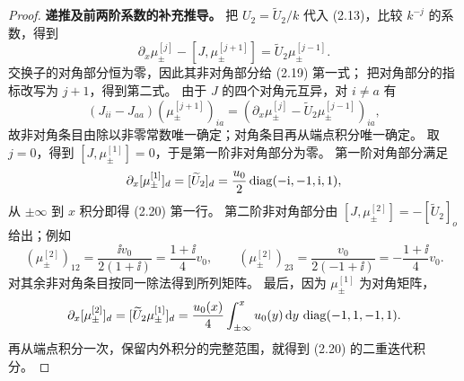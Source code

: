 \begin{proof}
\textbf{递推及前两阶系数的补充推导。}
把 $U_2=\widetilde U_2/k$ 代入 (2.13)，比较 $k^{-j}$ 的系数，得到
\[
\partial_x\mu_\pm^{[j]}-[J,\mu_\pm^{[j+1]}]
=\widetilde U_2\mu_\pm^{[j-1]}.
\]
交换子的对角部分恒为零，因此其非对角部分给 (2.19) 第一式；
把对角部分的指标改写为 $j+1$，得到第二式。
由于 $J$ 的四个对角元互异，对 $i\ne a$ 有
\[
(J_{ii}-J_{aa})(\mu_\pm^{[j+1]})_{ia}
=(\partial_x\mu_\pm^{[j]}-\widetilde U_2\mu_\pm^{[j-1]})_{ia},
\]
故非对角条目由除以非零常数唯一确定；对角条目再从端点积分唯一确定。
取 $j=0$，得到 $[J,\mu_\pm^{[1]}]=0$，于是第一阶非对角部分为零。
第一阶对角部分满足
\[
\partial_x[\mu_\pm^{[1]}]_d
=[\widetilde U_2]_d=\dfrac{u_0}{2}\operatorname{diag}(-\mathrm{i},-1,\mathrm{i},1),
\]
从 $\pm\infty$ 到 $x$ 积分即得 (2.20) 第一行。
第二阶非对角部分由 $[J,\mu_\pm^{[2]}]=-[\widetilde U_2]_o$ 给出；例如
\[
(\mu_\pm^{[2]})_{12}
=\dfrac{\ii v_0}{2(1+\ii)}=\dfrac{1+\ii}{4}v_0,
\qquad
(\mu_\pm^{[2]})_{23}
=\dfrac{v_0}{2(-1+\ii)}=-\dfrac{1+\ii}{4}v_0.
\]
对其余非对角条目按同一除法得到所列矩阵。
最后，因为 $\mu_\pm^{[1]}$ 为对角矩阵，
\[
\partial_x[\mu_\pm^{[2]}]_d
=[\widetilde U_2\mu_\pm^{[1]}]_d
=\dfrac{u_0(x)}{4}\int_{\pm\infty}^x u_0(y)\,\mathrm{d} y\,
\operatorname{diag}(-1,1,-1,1).
\]
再从端点积分一次，保留内外积分的完整范围，就得到 (2.20) 的二重迭代积分。
\end{proof}

